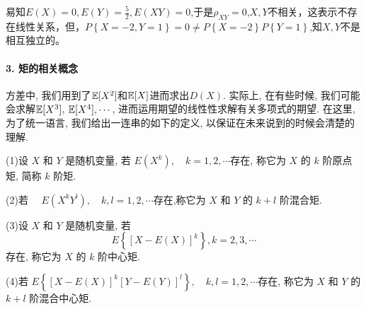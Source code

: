 \begin{solution}
    易知$E\left(X\right) = 0,E\left(Y\right) = \frac{5}{2},E\left(X Y\right) = 0$,于是$\rho_{X Y} = 0$,$X,Y$不相关，这表示不存在线性关系，但，$P\left\{X = -2,Y = 1\right\} = 0 \neq P\left\{ X = -2\right\}P\left\{Y = 1\right\}$,知$X,Y$不是相互独立的。
\end{solution}

\paragraph{3. 矩的相关概念} 方差中, 我们用到了$\mathbb E[X^2]$和$\mathbb E[X]$进而求出$D(X)$. 实际上, 在有些时候, 我们可能会求解$\mathbb E[X^3]$, $\mathbb E[X^4],\cdots$, 进而运用期望的线性性求解有关多项式的期望. 在这里, 为了统一语言, 我们给出一连串的如下的定义, 以保证在未来说到的时候会清楚的理解. 

\begin{definition}

    (1)设 $X$ 和 $Y$ 是随机变量, 若
    $
    E\left(X^k\right), \quad k=1,2, \cdots
    $存在, 称它为 $X$ 的 $k$ 阶原点矩, 简称 $k$ 阶矩.

    (2)若 $\quad E\left(X^k Y^l\right), \quad k, l=1,2, \cdots$存在,称它为 $X$ 和 $Y$ 的 $k+l$ 阶混合矩.

    (3)设 $X$ 和 $Y$ 是随机变量, 
        若 $$ E\left\{[X-E(X)]^k\right\}, k=2,3, \cdots$$存在, 称它为 $X$ 的 $k$ 阶中心矩.

     (4)若 $E\left\{[X-E(X)]^k[Y-E(Y)]^{l}\right\}, \quad k, l=1,2, \cdots$存在, 称它为 $X$ 和 $Y$ 的 $k+l$ 阶混合中心矩.
\end{definition}